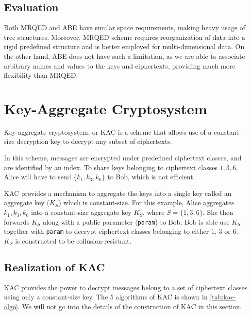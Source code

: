\documentclass[hyp,a4paper,12pt,openbib]{socreport}
\begin{document}
\subsection{Evaluation}
Both MRQED and ABE have similar space requirements, making heavy usage of tree structures. Moreover, MRQED scheme requires reorganization of data into a rigid predefined structure and is better employed for multi-dimensional data. On the other hand, ABE does not have such a limitation, as we are able to associate arbitrary names and values to the keys and ciphertexts, providing much more flexibility than MRQED.

\section{Key-Aggregate Cryptosystem}
\label{chap:kac}
Key-aggregate cryptosystem, or KAC \cite{chu2013key} is a scheme that allows use of a constant-size decryption key to decrypt any subset of ciphertexts. 

In this scheme, messages are encrypted under predefined ciphertext classes, and are identified by an index. To share keys belonging to ciphertext classes $1,3,6$, Alice will have to send $\{k_1, k_3, k_6\}$ to Bob, which is not efficient.

KAC provides a mechanism to aggregate the keys into a single key called an aggregate key ($K_S$) which is constant-size. For this example, Alice aggregates $k_1, k_3, k_6$ into a constant-size aggregate key $K_S$, where $S=\{1,3,6\}$. She then forwards $K_S$ along with a public parameter (\texttt{param}) to Bob. Bob is able use $K_S$ together with \texttt{param} to decrypt ciphertext classes belonging to either $1$, $3$ or $6$. $K_S$ is constructed to be collusion-resistant. 

\subsection{Realization of KAC}

KAC provides the power to decrypt messages belong to a set of ciphertext classes using only a constant-size key. The 5 algorithms of KAC is shown in \cref{tab:kac-algo}. We will not go into the details of the construction of KAC in this section.
\end{document}
